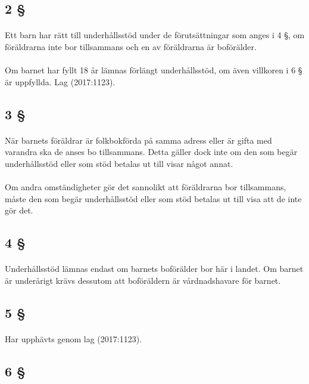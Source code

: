 \documentclass[a4paper,notitlepage,openany,10pt]{book}
\begin{document}
\subsection*{2 §}
\paragraph*{}
Ett barn har rätt till underhållsstöd under de förutsättningar som anges i 4 §, om föräldrarna inte bor tillsammans och en av föräldrarna är boförälder.
\paragraph*{}
Om barnet har fyllt 18 år lämnas förlängt underhållsstöd, om även villkoren i 6 § är uppfyllda.
Lag (2017:1123).
\subsection*{3 §}
\paragraph*{}
När barnets föräldrar är folkbokförda på samma adress eller är gifta med varandra ska de anses bo tillsammans.
Detta gäller dock inte om den som begär underhållsstöd eller som stöd betalas ut till visar något annat.
\paragraph*{}
Om andra omständigheter gör det sannolikt att föräldrarna bor tillsammans, måste den som begär underhållsstöd eller som stöd betalas ut till visa att de inte gör det.
\subsection*{4 §}
\paragraph*{}
Underhållsstöd lämnas endast om barnets boförälder bor här i landet. Om barnet är underårigt krävs dessutom att boföräldern är vårdnadshavare för barnet.
\subsection*{5 §}
\paragraph*{}
Har upphävts genom
lag (2017:1123).
\subsection*{6 §}
\end{document}
